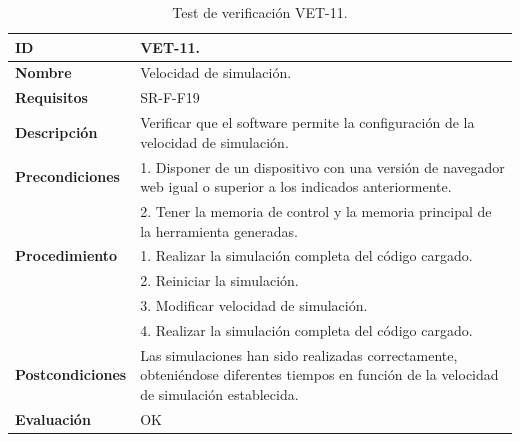 \begin{center}
\begin{table}[htb]
\centering
\caption{Test de verificación VET-11.}
\begin{tabular}{@{}p{2.5cm} p{13cm}@{}} 
\toprule
\textbf{ID} 					& VET-11. \\
\midrule
\textbf{Nombre} 				& Velocidad de simulación. \\
\midrule
\textbf{Requisitos} 		& SR-F-F19\\
\midrule
\textbf{Descripción} 		& Verificar que el software permite la configuración de la velocidad de simulación. \\
\midrule
\textbf{Precondiciones}		& 1. Disponer de un dispositivo con una versión de navegador web igual o superior a los indicados anteriormente. \\
											& 2. Tener la memoria de control y la memoria principal de la herramienta generadas. \\
\midrule
\textbf{Procedimiento}		& 1. Realizar la simulación completa del código cargado.\\
											& 2. Reiniciar la simulación.\\
											& 3. Modificar velocidad de simulación. \\
											& 4. Realizar la simulación completa del código cargado.\\
\midrule
\textbf{Postcondiciones} 		&  Las simulaciones han sido realizadas correctamente, obteniéndose diferentes tiempos en función de la velocidad de simulación establecida.\\
\midrule
\textbf{Evaluación} 			& OK \\
\bottomrule
\end{tabular}
\label{tab:vet11}
\end{table}
\end{center}

